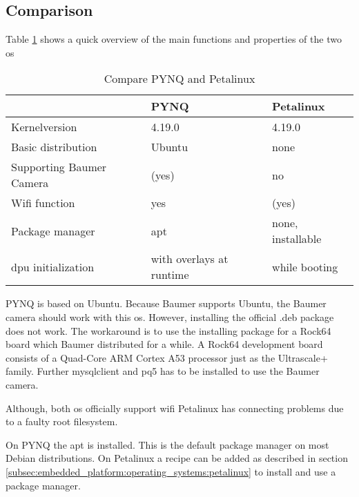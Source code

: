 \subsection{Comparison}
\label{subsec:embedded_platform:operating_systems:comparison}
Table \ref{tab:compare_os} shows a quick overview of the main functions and properties of the two \acrlong{os}

\begin{table}[hb]
  \caption{Compare PYNQ and Petalinux}
  \label{tab:compare_os}
  \centering
  \begin{tabular}{lll}
    \toprule
    \textbf{} & \textbf{PYNQ} & \textbf{Petalinux} \\
    \midrule
    Kernelversion & 4.19.0 & 4.19.0 \\
    Basic distribution & Ubuntu \cite{pynq_presentation} & none \\
    Supporting Baumer Camera & (yes) \cite{baumer_prog_guide} & no \\
    Wifi function & yes & (yes) \\
    Package manager & \acrshort{apt} & none, installable \\
    \acrshort{dpu} initialization & with overlays at runtime \cite{pynq_overlays} & while booting \cite{petalinux_user_guide} \\
    \bottomrule
  \end{tabular}
\end{table}

PYNQ is based on Ubuntu.
Because Baumer supports Ubuntu, the Baumer camera should work with this \acrlong{os}.
However, installing the official .deb package does not work.
The workaround is to use the installing package for a Rock64 board which Baumer distributed for a while.
A Rock64 development board consists of a Quad-Core ARM Cortex A53 processor just as the Ultrascale+ family.
Further mysqlclient and pq5 has to be installed to use the Baumer camera.

Although, both \acrshort{os} officially support wifi Petalinux has connecting problems due to a faulty root filesystem.

On PYNQ the \acrfull{apt} is installed.
This is the default package manager on most Debian distributions.
On Petalinux a recipe can be added as described in section \ref{subsec:embedded_platform:operating_systems:petalinux} to install and use a package manager.

